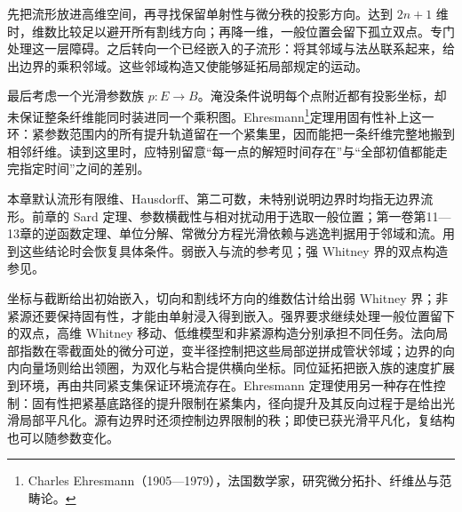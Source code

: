 \ProseParagraphBreak

先把流形放进高维空间，再寻找保留单射性与微分秩的投影方向。达到 \(2n+1\) 维时，维数比较足以避开所有割线方向；再降一维，一般位置会留下孤立双点。专门处理这一层障碍。之后转向一个已经嵌入的子流形：将其邻域与法丛联系起来，给出边界的乘积邻域。这些邻域构造又使能够延拓局部规定的运动。

\ProseParagraphBreak

最后考虑一个光滑参数族 \(p:E\to B\)。淹没条件说明每个点附近都有投影坐标，却未保证整条纤维能同时装进同一个乘积图。Ehresmann\footnote{Charles Ehresmann（1905—1979），法国数学家，研究微分拓扑、纤维丛与范畴论。}定理用固有性补上这一环：紧参数范围内的所有提升轨道留在一个紧集里，因而能把一条纤维完整地搬到相邻纤维。读到这里时，应特别留意“每一点的解短时间存在”与“全部初值都能走完指定时间”之间的差别。

\ProseParagraphBreak

本章默认流形有限维、Hausdorff、第二可数，未特别说明边界时均指无边界流形。前章的 Sard 定理、参数横截性与相对扰动用于选取一般位置；第一卷第11—13章的逆函数定理、单位分解、常微分方程光滑依赖与逃逸判据用于邻域和流。用到这些结论时会恢复具体条件。弱嵌入与流的参考见\cite[第6、9章]{Lee2012Smooth}；强 Whitney 界的双点构造参见\cite{Whitney1944SelfIntersections}。








\begin{chaptersummary}
	坐标与截断给出初始嵌入，切向和割线坏方向的维数估计给出弱 Whitney 界；非紧源还要保持固有性，才能由单射浸入得到嵌入。强界要求继续处理一般位置留下的双点，高维 Whitney 移动、低维模型和非紧源构造分别承担不同任务。法向局部指数在零截面处的微分可逆，变半径控制把这些局部逆拼成管状邻域；边界的向内向量场则给出领圈，为双化与粘合提供横向坐标。同位延拓把嵌入族的速度扩展到环境，再由共同紧支集保证环境流存在。Ehresmann 定理使用另一种存在性控制：固有性把紧基底路径的提升限制在紧集内，径向提升及其反向过程于是给出光滑局部平凡化。源有边界时还须控制边界限制的秩；即使已获光滑平凡化，复结构也可以随参数变化。
\end{chaptersummary}

\BookExercises

